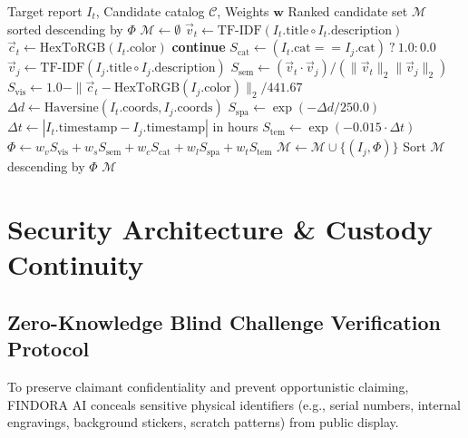 \documentclass[conference]{IEEEtran}
\begin{document}
\begin{algorithm}[htbp]
\caption{FINDORA Multimodal Candidate Retrieval}
\label{alg:multimodal}
\begin{algorithmic}[1]
\REQUIRE Target report $I_t$, Candidate catalog $\mathcal{C}$, Weights $\mathbf{w}$
\ENSURE Ranked candidate set $\mathcal{M}$ sorted descending by $\Phi$
\STATE $\mathcal{M} \leftarrow \emptyset$
\STATE $\vec{v}_t \leftarrow \text{TF-IDF}(I_t.\text{title} \circ I_t.\text{description})$
\STATE $\vec{c}_t \leftarrow \text{HexToRGB}(I_t.\text{color})$
        \STATE \textbf{continue} 
    \ENDIF
    \STATE $S_{\text{cat}} \leftarrow (I_t.\text{cat} == I_j.\text{cat}) \ ? \ 1.0 : 0.0$
    \STATE $\vec{v}_j \leftarrow \text{TF-IDF}(I_j.\text{title} \circ I_j.\text{description})$
    \STATE $S_{\text{sem}} \leftarrow (\vec{v}_t \cdot \vec{v}_j) / (\|\vec{v}_t\|_2 \|\vec{v}_j\|_2)$
    \STATE $S_{\text{vis}} \leftarrow 1.0 - \|\vec{c}_t - \text{HexToRGB}(I_j.\text{color})\|_2 / 441.67$
    \STATE $\Delta d \leftarrow \text{Haversine}(I_t.\text{coords}, I_j.\text{coords})$
    \STATE $S_{\text{spa}} \leftarrow \exp(-\Delta d / 250.0)$
    \STATE $\Delta t \leftarrow |I_t.\text{timestamp} - I_j.\text{timestamp}|$ in hours
    \STATE $S_{\text{tem}} \leftarrow \exp(-0.015 \cdot \Delta t)$
    \STATE $\Phi \leftarrow w_v S_{\text{vis}} + w_s S_{\text{sem}} + w_c S_{\text{cat}} + w_l S_{\text{spa}} + w_t S_{\text{tem}}$
        \STATE $\mathcal{M} \leftarrow \mathcal{M} \cup \{(I_j, \Phi)\}$
    \ENDIF
\ENDFOR
\STATE Sort $\mathcal{M}$ descending by $\Phi$
\RETURN $\mathcal{M}$
\end{algorithmic}
\end{algorithm}

\section{Security Architecture \& Custody Continuity}

\subsection{Zero-Knowledge Blind Challenge Verification Protocol}
To preserve claimant confidentiality and prevent opportunistic claiming, FINDORA AI conceals sensitive physical identifiers (e.g., serial numbers, internal engravings, background stickers, scratch patterns) from public display. 
\end{document}
